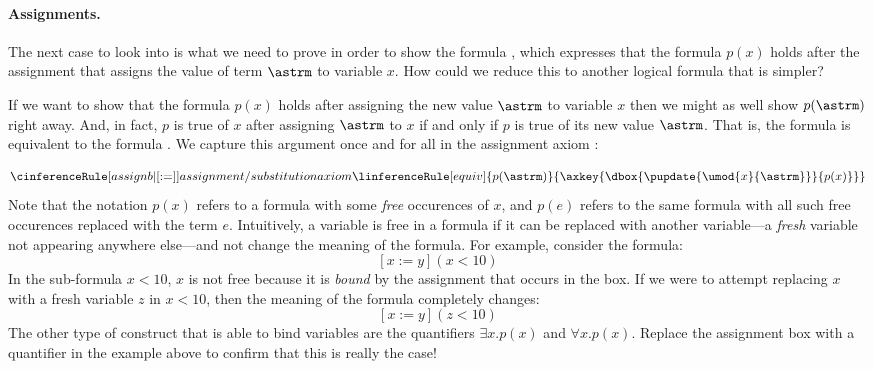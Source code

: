 \documentclass[11pt,twoside]{scrartcl}
\begin{document}
\paragraph{Assignments.}

The next case to look into is what we need to prove in order to show the formula , which expresses that the formula $p(x)$ holds after the assignment  that assigns the value of term $\astrm$ to variable $x$.
How could we reduce this to another logical formula that is simpler?

If we want to show that the formula $p(x)$ holds after assigning the new value $\astrm$ to variable $x$ then we might as well show $p(\astrm)$ right away.
And, in fact, $p$ is true of $x$ after assigning $\astrm$ to $x$ if and only if $p$ is true of its new value $\astrm$.
That is, the formula  is equivalent to the formula .
We capture this argument once and for all in the assignment axiom :

\[
\cinferenceRule[assignb|$\dibox{:=}$]{assignment / substitution axiom}
{\linferenceRule[equiv]
  {p(\astrm)}
  {\axkey{\dbox{\pupdate{\umod{x}{\astrm}}}{p(x)}}}
}
{}%
\]
Note that the notation $p(x)$ refers to a formula with some \emph{free} occurences of $x$, and $p(e)$ refers to the same formula with all such free occurences replaced with the term $e$.
Intuitively, a variable is free in a formula if it can be replaced with another variable---a \emph{fresh} variable not appearing anywhere else---and not change the meaning of the formula.
For example, consider the formula:
\[
[x := y](x < 10)
\]
In the sub-formula $x < 10$, $x$ is not free because it is \emph{bound} by the assignment that occurs in the box.
If we were to attempt replacing $x$ with a fresh variable $z$ in $x < 10$, then the meaning of the formula completely changes:
\[
[x := y](z < 10)
\]
The other type of construct that is able to bind variables are the quantifiers $\exists x. p(x)$ and $\forall x. p(x)$.
Replace the assignment box with a quantifier in the example above to confirm that this is really the case!
\end{document}
